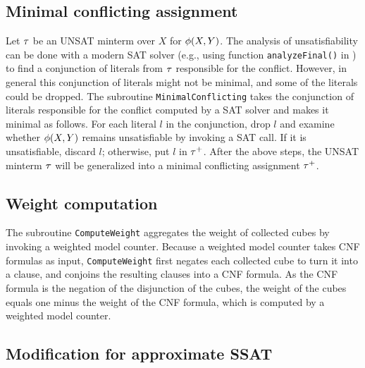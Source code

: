 \subsection{Minimal conflicting assignment}
Let $\tau$ be an UNSAT minterm over $X$ for $\phi(X,Y)$.
The analysis of unsatisfiability can be done with a modern SAT solver (e.g., using function \texttt{analyzeFinal()} in \minisat) to find a conjunction of literals from $\tau$ responsible for the conflict.
However, in general this conjunction of literals might not be minimal,
and some of the literals could be dropped.
The subroutine \texttt{MinimalConflicting} takes the conjunction of literals responsible for the conflict computed by a SAT solver and makes it minimal as follows.
For each literal $l$ in the conjunction,
drop $l$ and examine whether $\phi(X,Y)$ remains unsatisfiable by invoking a SAT call.
If it is unsatisfiable, discard $l$; otherwise, put $l$ in $\tau^+$.
After the above steps, the UNSAT minterm $\tau$ will be generalized into a minimal conflicting assignment $\tau^+$.

\subsection{Weight computation}
The subroutine \texttt{ComputeWeight} aggregates the weight of collected cubes by invoking a weighted model counter.
Because a weighted model counter takes CNF formulas as input,
\texttt{ComputeWeight} first negates each collected cube to turn it into a clause,
and conjoins the resulting clauses into a CNF formula.
As the CNF formula is the negation of the disjunction of the cubes,
the weight of the cubes equals one minus the weight of the CNF formula,
which is computed by a weighted model counter.

\subsection{Modification for approximate SSAT}
\label{sect:ressat-approximate}

